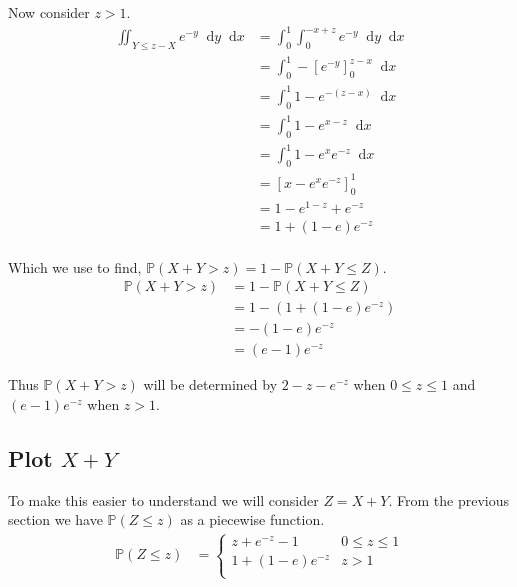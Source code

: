 \documentclass{article}
\newcommand{\diff}{\mathop{}\!\mathrm{d}}
\newcommand{\prob}{\mathbb{P}}
\begin{document}
Now consider $z > 1$.
\begin{align*}
    \iint_{Y \leq z - X} e^{-y} \diff y \diff x
    &= \int_0^1 \int_0^{-x+z} e^{-y} \diff y \diff x \\
    &= \int_0^1 - \left[ e^{-y} \right]_0^{z-x}  \diff x \\
    &= \int_0^1 1 - e^{-(z-x)} \diff x \\
    &= \int_0^1 1 - e^{x-z} \diff x \\
    &= \int_0^1 1 - e^{x} e^{-z} \diff x \\
    &= \left[ x - e^{x} e^{-z} \right]_0^1 \\
    &= 1 - e^{1-z} + e^{-z} \\
    &= 1 + (1 - e)e^{-z} \\
\end{align*}

Which we use to find, $\prob(X+Y>z) = 1 - \prob(X+Y \leq Z)$.
\begin{align*}
    \prob(X+Y>z) &= 1 - \prob(X+Y \leq Z) \\
    &= 1 - (1 + (1 - e)e^{-z}) \\
    &= -(1 - e)e^{-z} \\
    &= (e - 1)e^{-z}
\end{align*}

Thus $\prob(X+Y>z)$ will be determined by $2 - z - e^{-z}$ when
$0 \leq z \leq 1$ and $(e - 1)e^{-z}$ when $z > 1$.

\subsection{Plot $X+Y$}
To make this easier to understand we will consider $Z=X+Y$.
From the previous section we have $\prob(Z \leq z)$ as a piecewise function.
\begin{align*}
    \prob(Z \leq z)
    &=
    \begin{cases}
        z + e^{-z} - 1 & 0 \leq z \leq 1 \\
        1 + (1 - e)e^{-z} & z > 1 \\
    \end{cases}
\end{align*}
\end{document}
